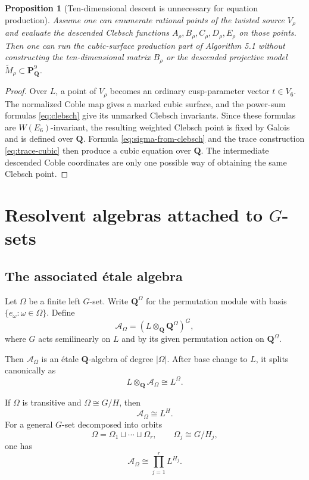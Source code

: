 \documentclass[11pt]{article}
\newcommand{\QQ}{\mathbf{Q}}
\newcommand{\PP}{\mathbf{P}}
\newcommand{\tM}{\widetilde{M}}
\newcommand{\cA}{\mathcal{A}}
\newcommand{\V}{V_6}
\newtheorem{proposition}[definition]{Proposition}
\begin{document}
\begin{proposition}[Ten-dimensional descent is unnecessary for equation production]
Assume one can enumerate rational points of the twisted source $V_\rho$ and
evaluate the descended Clebsch functions $A_\rho,B_\rho,C_\rho,D_\rho,E_\rho$ on
those points.  Then one can run the cubic-surface production part of Algorithm 5.1
without constructing the ten-dimensional matrix $B_\rho$ or the descended
projective model $\tM_\rho\subset\PP^9_\QQ$.
\end{proposition}

\begin{proof}
Over $L$, a point of $V_\rho$ becomes an ordinary cusp-parameter vector
$t\in\V$.  The normalized Coble map gives a marked cubic surface, and the power-sum
formulas \eqref{eq:clebsch} give its unmarked Clebsch invariants.  Since these
formulas are $W(E_6)$-invariant, the resulting weighted Clebsch point is fixed by
Galois and is defined over $\QQ$.  Formula \eqref{eq:sigma-from-clebsch} and the
trace construction \eqref{eq:trace-cubic} then produce a cubic equation over
$\QQ$.  The intermediate descended Coble coordinates are only one possible way of
obtaining the same Clebsch point.
\end{proof}

\section{Resolvent algebras attached to $G$-sets}

\subsection{The associated \'etale algebra}

Let $\Omega$ be a finite left $G$-set.  Write $\QQ^\Omega$ for the permutation
module with basis $\{e_\omega:\omega\in\Omega\}$.  Define
\begin{equation}
  \cA_\Omega=(L\otimes_\QQ \QQ^\Omega)^G,
  \label{eq:AOmega}
\end{equation}
where $G$ acts semilinearly on $L$ and by its given permutation action on
$\QQ^\Omega$.

Then $\cA_\Omega$ is an \'etale $\QQ$-algebra of degree $|\Omega|$.  After base
change to $L$, it splits canonically as
\begin{equation}
  L\otimes_\QQ \cA_\Omega\cong L^\Omega.
  \label{eq:AOmega-split}
\end{equation}

If $\Omega$ is transitive and $\Omega\cong G/H$, then
\begin{equation}
  \cA_\Omega\cong L^H.
  \label{eq:transitive-resolvent-field}
\end{equation}
For a general $G$-set decomposed into orbits
\[
  \Omega=\Omega_1\sqcup\cdots\sqcup\Omega_r,
  \qquad
  \Omega_j\cong G/H_j,
\]
one has
\begin{equation}
  \cA_\Omega\cong \prod_{j=1}^r L^{H_j}.
  \label{eq:orbit-product}
\end{equation}
\end{document}

